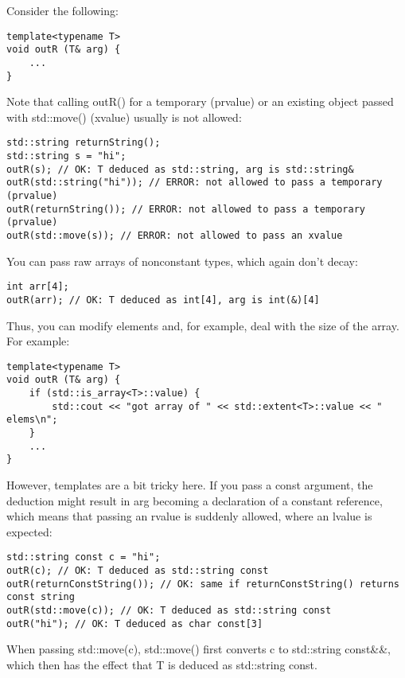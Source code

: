 Consider the following:

\begin{lstlisting}[style=styleCXX]
template<typename T>
void outR (T& arg) {
	...
}
\end{lstlisting}

Note that calling outR() for a temporary (prvalue) or an existing object passed with std::move() (xvalue) usually is not allowed:

\begin{lstlisting}[style=styleCXX]
std::string returnString();
std::string s = "hi";
outR(s); // OK: T deduced as std::string, arg is std::string&
outR(std::string("hi")); // ERROR: not allowed to pass a temporary (prvalue)
outR(returnString()); // ERROR: not allowed to pass a temporary (prvalue)
outR(std::move(s)); // ERROR: not allowed to pass an xvalue
\end{lstlisting}

You can pass raw arrays of nonconstant types, which again don’t decay:

\begin{lstlisting}[style=styleCXX]
int arr[4];
outR(arr); // OK: T deduced as int[4], arg is int(&)[4]
\end{lstlisting}

Thus, you can modify elements and, for example, deal with the size of the array. For example:

\begin{lstlisting}[style=styleCXX]
template<typename T>
void outR (T& arg) {
	if (std::is_array<T>::value) {
		std::cout << "got array of " << std::extent<T>::value << " elems\n";
	}
	...
}
\end{lstlisting}

However, templates are a bit tricky here. If you pass a const argument, the deduction might result in arg becoming a declaration of a constant reference, which means that passing an rvalue is suddenly allowed, where an lvalue is expected:

\begin{lstlisting}[style=styleCXX]
std::string const c = "hi";
outR(c); // OK: T deduced as std::string const
outR(returnConstString()); // OK: same if returnConstString() returns const string
outR(std::move(c)); // OK: T deduced as std::string const
outR("hi"); // OK: T deduced as char const[3]
\end{lstlisting}

\begin{tcolorbox}[colback=webgreen!5!white,colframe=webgreen!75!black]
\hspace*{0.75cm}When passing std::move(c), std::move() first converts c to std::string const\&\&, which then has the effect that T is deduced as std::string const.
\end{tcolorbox}

